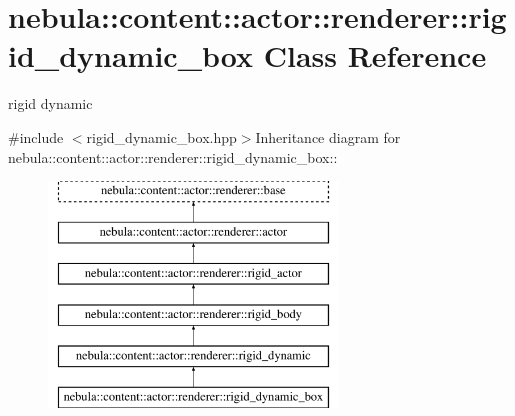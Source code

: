 \hypertarget{classnebula_1_1content_1_1actor_1_1renderer_1_1rigid__dynamic__box}{
\section{nebula::content::actor::renderer::rigid\_\-dynamic\_\-box Class Reference}
\label{classnebula_1_1content_1_1actor_1_1renderer_1_1rigid__dynamic__box}
}


rigid dynamic  


{\ttfamily \#include $<$rigid\_\-dynamic\_\-box.hpp$>$}Inheritance diagram for nebula::content::actor::renderer::rigid\_\-dynamic\_\-box::\begin{figure}[H]
\begin{center}
\leavevmode
\includegraphics[height=6cm]{classnebula_1_1content_1_1actor_1_1renderer_1_1rigid__dynamic__box}
\end{center}
\end{figure}
